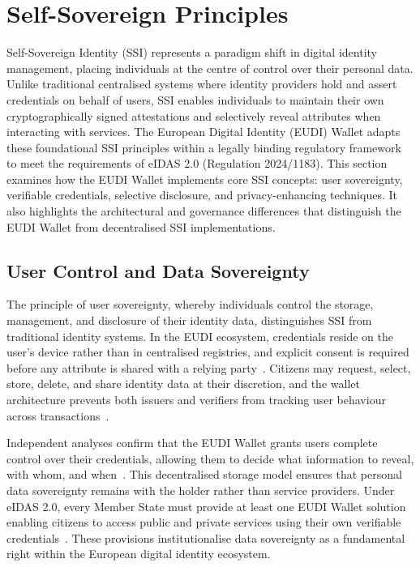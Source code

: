 \documentclass[sigconf,balance,nonacm,authordraft]{acmart}
\begin{document}
\section{Self-Sovereign Principles}
\label{sec:ssi}

Self-Sovereign Identity (SSI) represents a paradigm shift in digital identity management, placing individuals at the centre of control over their personal data. Unlike traditional centralised systems where identity providers hold and assert credentials on behalf of users, SSI enables individuals to maintain their own cryptographically signed attestations and selectively reveal attributes when interacting with services. The European Digital Identity (EUDI) Wallet adapts these foundational SSI principles within a legally binding regulatory framework to meet the requirements of eIDAS 2.0 (Regulation 2024/1183). This section examines how the EUDI Wallet implements core SSI concepts: user sovereignty, verifiable credentials, selective disclosure, and privacy-enhancing techniques. It also highlights the architectural and governance differences that distinguish the EUDI Wallet from decentralised SSI implementations.

\subsection{User Control and Data Sovereignty}

The principle of user sovereignty, whereby individuals control the storage, management, and disclosure of their identity data, distinguishes SSI from traditional identity systems. In the EUDI ecosystem, credentials reside on the user's device rather than in centralised registries, and explicit consent is required before any attribute is shared with a relying party~\cite{ZKPDiscussion_Recital15,ZKPDiscussion_Article5a}. Citizens may request, select, store, delete, and share identity data at their discretion, and the wallet architecture prevents both issuers and verifiers from tracking user behaviour across transactions~\cite{ZKPDiscussion_Article5a}. 

Independent analyses confirm that the EUDI Wallet grants users complete control over their credentials, allowing them to decide what information to reveal, with whom, and when~\cite{Gataca_ARF_SSI,ISC2_PrivacyDataSovereignty}. This decentralised storage model ensures that personal data sovereignty remains with the holder rather than service providers. Under eIDAS 2.0, every Member State must provide at least one EUDI Wallet solution enabling citizens to access public and private services using their own verifiable credentials~\cite{PortoThesis}. These provisions institutionalise data sovereignty as a fundamental right within the European digital identity ecosystem.
\end{document}
